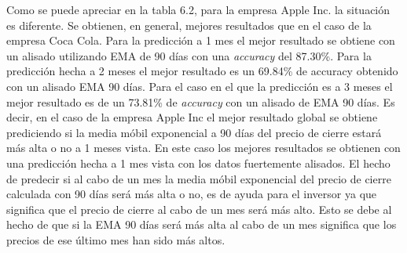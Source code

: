 \documentclass[]{article}
\begin{document}
Como se puede apreciar en la tabla 6.2, para la empresa Apple Inc. la
situación es diferente. Se obtienen, en general, mejores resultados que
en el caso de la empresa Coca Cola. Para la predicción a 1 mes el mejor
resultado se obtiene con un alisado utilizando EMA de 90 días con una
\emph{accuracy} del 87.30\%. Para la predicción hecha a 2 meses el mejor
resultado es un 69.84\% de accuracy obtenido con un alisado EMA 90 días.
Para el caso en el que la predicción es a 3 meses el mejor resultado es
de un 73.81\% de \emph{accuracy} con un alisado de EMA 90 días. Es
decir, en el caso de la empresa Apple Inc el mejor resultado global se
obtiene prediciendo si la media móbil exponencial a 90 días del precio
de cierre estará más alta o no a 1 meses vista. En este caso los mejores
resultados se obtienen con una predicción hecha a 1 mes vista con los
datos fuertemente alisados. El hecho de predecir si al cabo de un mes la
media móbil exponencial del precio de cierre calculada con 90 días será
más alta o no, es de ayuda para el inversor ya que significa que el
precio de cierre al cabo de un mes será más alto. Esto se debe al hecho
de que si la EMA 90 días será más alta al cabo de un mes significa que
los precios de ese último mes han sido más altos.
\end{document}
